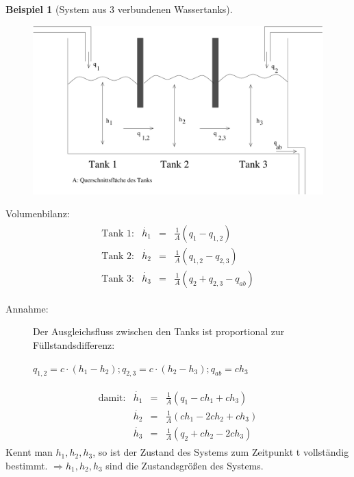 \documentclass[12pt,a4paper,ngerman]{scrartcl}
\newtheorem{bsp}{Beispiel}[section] %
\begin{document}
\begin{bsp}[System aus 3 verbundenen Wassertanks]
\end{bsp}
\begin{figure}[H]
  \centering
  \includegraphics[width=.9\linewidth]{sysregel_bsp_2,2}
\end{figure}
Volumenbilanz:
\begin{align*}
  \begin{array}{llll}
    \text{Tank 1:}&\dot{h_1}&=&\frac{1}{A}(q_1-q_{1,2})\\
    \text{Tank 2:}&\dot{h_2}&=&\frac{1}{A}(q_{1,2}-q_{2,3})\\
    \text{Tank 3:}&\dot{h_3}&=&\frac{1}{A}(q_{2}+q_{2,3}-q_{ab})
  \end{array}
\end{align*}
\begin{description}
\item[Annahme:]Der Ausgleichsfluss zwischen den Tanks ist proportional zur Füllstandsdifferenz: \begin{center}  $q_{1,2}=c\cdot (h_1-h_2);q_{2,3}=c\cdot (h_2-h_3);q_{ab}=ch_3$ \end{center}
\end{description}
\begin{align*}
  \begin{array}{llll}
    \text{damit:}&\dot{h_1}&=&\frac{1}{A}(q_1-ch_1+ch_3)\\
                 &\dot{h_2}&=&\frac{1}{A}(ch_1-2ch_2+ch_3)\\
                 &\dot{h_3}&=&\frac{1}{A}(q_2+ch_2-2ch_3)
  \end{array}
\end{align*}
Kennt man $h_1,h_2,h_3$, so ist der Zustand des Systems zum Zeitpunkt t vollständig bestimmt. $\Rightarrow h_1,h_2,h_3$ sind die Zustandsgrößen des Systems.\\
\end{document}
